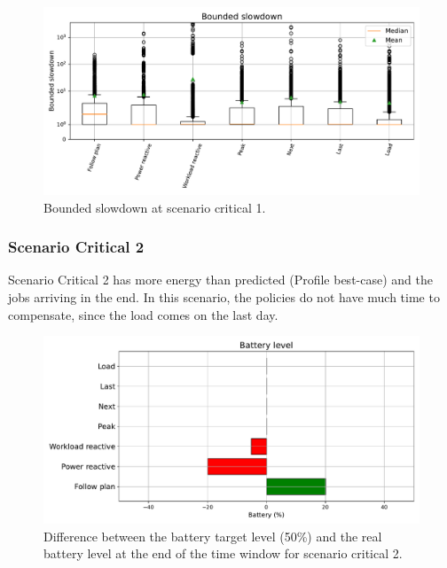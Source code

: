 \begin{figure}[!htb]
    \centering
    \includegraphics[scale=0.55]{Images/Compensations/slowdown_critical_1.pdf}
    \caption{Bounded slowdown at scenario critical 1.}
    \label{fig:slowdown_critical_1}
\end{figure}

\clearpage

\subsubsection{Scenario Critical 2}

Scenario Critical 2 has more energy than predicted (Profile best-case) and the jobs arriving in the end. In this scenario, the policies do not have much time to compensate, since the load comes on the last day. 

\begin{figure}[!htb]
    \centering
    \includegraphics[scale=0.55]{Images/Compensations/battery_critical_2.pdf}
    \caption{Difference between the battery target level (50\%) and the real battery level at the end of the time window for scenario critical 2.}
    \label{fig:SoC_critical_2}
\end{figure}

